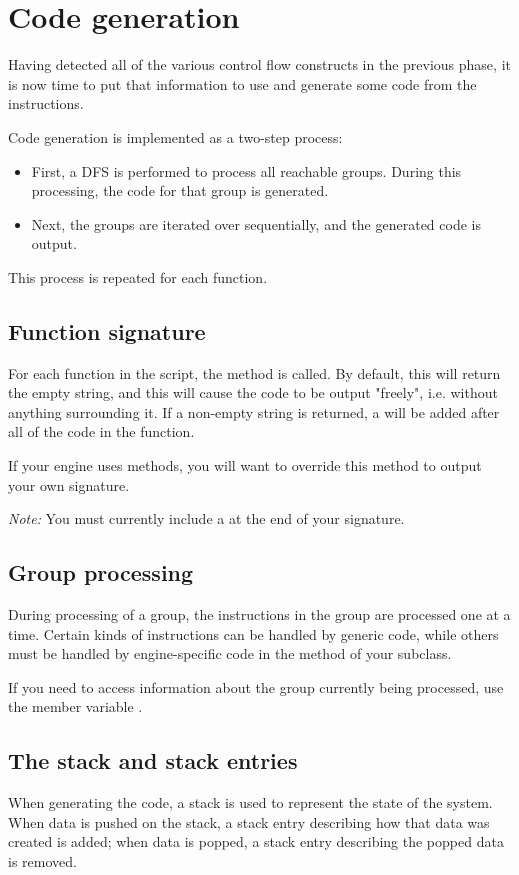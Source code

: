 \section{Code generation}
\label{sec:codegen}

Having detected all of the various control flow constructs in the previous phase, it is now time to put that information to use and generate some code from the instructions.

Code generation is implemented as a two-step process:
\begin{itemize}
\item First, a DFS is performed to process all reachable groups. During this processing, the code for that group is generated.
\item Next, the groups are iterated over sequentially, and the generated code is output.
\end{itemize}

This process is repeated for each function.

\subsection{Function signature}
For each function in the script, the  method is called. By default, this will return the empty string, and this will cause the code to be output "freely", i.e. without anything surrounding it. If a non-empty string is returned, a \code{\}} will be added after all of the code in the function.

If your engine uses methods, you will want to override this method to output your own signature.

\emph{Note:} You must currently include a \code{\{} at the end of your signature.

\subsection{Group processing}
During processing of a group, the instructions in the group are processed one at a time. Certain kinds of instructions can be handled by generic code, while others must be handled by engine-specific code in the  method of your subclass.

If you need to access information about the group currently being processed, use the member variable .

\subsection{The stack and stack entries}
When generating the code, a stack is used to represent the state of the system. When data is pushed on the stack, a stack entry describing how that data was created is added; when data is popped, a stack entry describing the popped data is removed.

